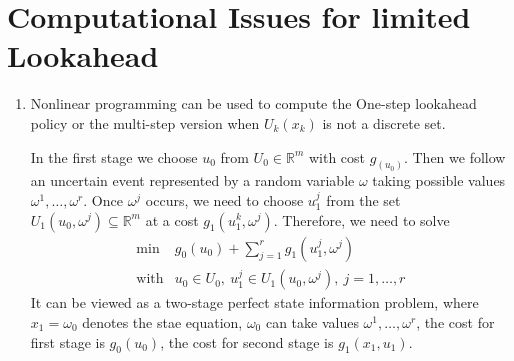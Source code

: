 \section{Computational Issues for limited Lookahead}
\begin{enumerate}
\item
Nonlinear programming can be used to compute the One-step lookahead policy or the multi-step version when $U_k(x_k)$ is not a discrete set. 
\begin{example}
In the first stage we choose $u_0$ from $U_0\in\mathbb{R}^m$ with cost $g_(u_0)$. Then we follow an uncertain event represented by a random variable $\omega$ taking possible values $\omega^1,\dots,\omega^r$. Once $\omega^j$ occurs, we need to choose $u_1^j$ from the set $U_1(u_0,\omega^j)\subseteq\mathbb{R}^m$ at a cost $g_1(u_1^k,\omega^j)$.
Therefore, we need to solve
\[
\begin{array}{ll}
\min&g_0(u_0)+\sum_{j=1}^rg_1(u_1^j,\omega^j)\\
\text{with}&u_0\in U_0,\ u_1^j\in U_1(u_0,\omega^j),\ j=1,\dots,r
\end{array}
\]
It can be viewed as a two-stage perfect state information problem, where
$x_1=\omega_0$ denotes the stae equation, $\omega_0$ can take values $\omega^1,\dots,\omega^r$, the cost for first stage is $g_0(u_0)$, the cost for second stage is $g_1(x_1,u_1)$.


\end{example}
\end{enumerate}
